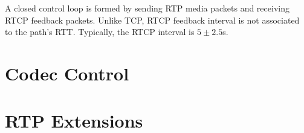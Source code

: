 A closed control loop is formed by sending RTP media packets and receiving
RTCP feedback packets. Unlike TCP, RTCP feedback interval is not associated to
the path's RTT. Typically, the RTCP interval is $5 \pm 2.5$s. 



\section{Codec Control}

\section{RTP Extensions}
\label{rtp.ext}

